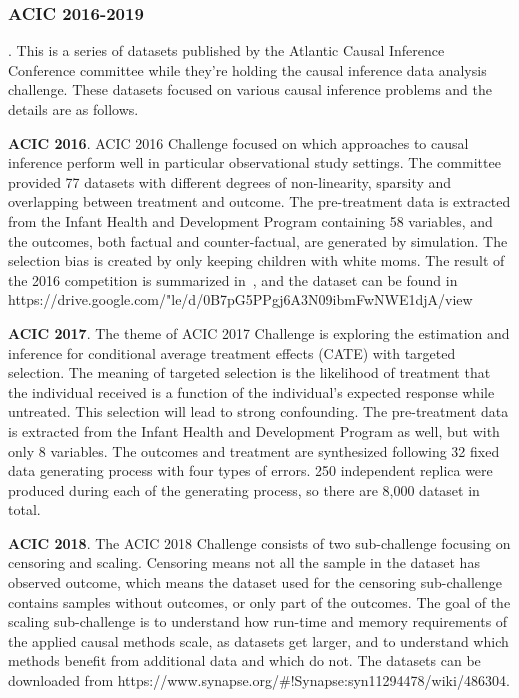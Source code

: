 \subsubsection{ACIC 2016-2019}.
This is a series of datasets published by the Atlantic Causal Inference Conference committee while they're holding the
causal inference data analysis challenge.
These datasets focused on various causal inference problems and the details are as follows.

\textbf{ACIC 2016}.
ACIC 2016 Challenge focused on which approaches to causal inference perform well in particular observational study
settings.
The committee provided 77 datasets with different degrees of non-linearity, sparsity and overlapping between treatment
and outcome.
The pre-treatment data is extracted from the Infant Health and Development Program containing 58 variables, and the
outcomes, both factual and counter-factual, are generated by simulation.
The selection bias is created by only keeping children with white moms.
The result of the 2016 competition is summarized in~\cite{dorie2019automated}, and the dataset can be found in
https://drive.google.com/"le/d/0B7pG5PPgj6A3N09ibmFwNWE1djA/view

\textbf{ACIC 2017}.
The theme of ACIC 2017 Challenge is exploring the estimation and inference for conditional average treatment effects
(CATE) with targeted selection.
The meaning of targeted selection is the likelihood of treatment that the individual received is a function of the
individual's expected response while untreated.
This selection will lead to strong confounding\cite{hahn2019atlantic}.
The pre-treatment data is extracted from the Infant Health and Development Program as well, but with only 8 variables.
The outcomes and treatment are synthesized following 32 fixed data generating process with four types of errors.
250 independent replica were produced during each of the generating process, so there are 8,000 dataset in total.

\textbf{ACIC 2018}.
The ACIC 2018 Challenge consists of two sub-challenge focusing on censoring and scaling.
Censoring means not all the sample in the dataset has observed outcome, which means the dataset used for the censoring
sub-challenge contains samples without outcomes, or only part of the outcomes.
The goal of the scaling sub-challenge is to understand how run-time and memory requirements of the applied causal
methods scale, as datasets get larger, and to understand which methods benefit from additional data and which do not.
The datasets can be downloaded from https://www.synapse.org/\#!Synapse:syn11294478/wiki/486304.

